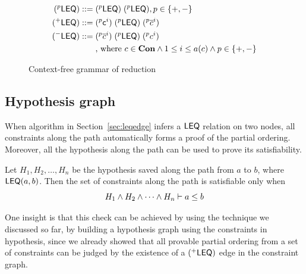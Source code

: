 \begin{figure}
\hfil
\begin{minipage}{2.3in}
\begin{align*}
(^{p}\mathsf{LEQ}) ::=\; & (^{p}\mathsf{LEQ})\; (^{p}\mathsf{LEQ}), p\in \{+,-\} \\
(^{+}\mathsf{LEQ}) ::=\; & (^{p}\textsf{c}^{i})\; (^{p}\mathsf{LEQ})\;
(^{p}\overline{c}^{i}) \\
(^{-}\mathsf{LEQ}) ::=\; & (^{p}\overline{c}^{i})\;
(^{p}\mathsf{LEQ})\; (^{p}c^{i}) \\
     & \text{, where } c\in \mathbf{Con} \land 1 \leq i\leq a(c) \land p\in \{+,-\}\\
\end{align*}
\end{minipage}
\caption{Context-free grammar of reduction}
\label{figure:cfg}
\end{figure}

% 
\subsection{Hypothesis graph}
\label{sec:hypograph}

When algorithm in Section~\ref{sec:leqedge} infers a $\mathsf{LEQ}$ relation
on two nodes, all constraints along the path automatically forms a
proof of the partial ordering. Moreover, all the hypothesis along the
path can be used to prove its satisfiability.

Let $H_1, H_2, \dots, H_n$ be the hypothesis saved along the path from $a$ to
$b$, where $\mathsf{LEQ}(a,b)$. Then the set of constraints along the path is
satisfiable only when
\[H_1 \land H_2 \land \dots \land H_n \vdash a \leq b\]

One insight is that this check can be achieved by using the technique
we discussed so far, by building a hypothesis graph using the
constraints in hypothesis, since we already showed that all provable
partial ordering from a set of constraints can be judged by the
existence of a $(^{+}\mathsf{LEQ})$ edge in the constraint graph.


